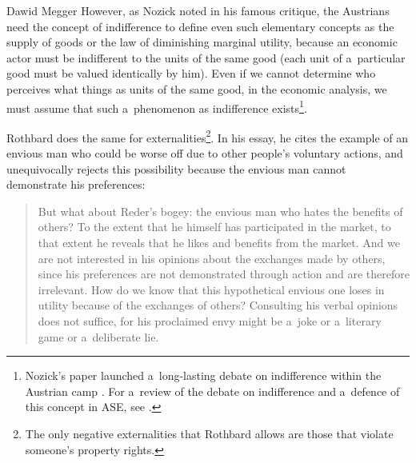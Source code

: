 \begin{artengenv}{Dawid Megger}
However, as Nozick 
\parencite*[][]{nozick_austrian_1977} %
 noted in his famous critique, the Austrians need the concept of indifference to define even such elementary concepts as the supply of goods or the law of diminishing marginal utility, because an economic actor must be indifferent to the units of the same good (each unit of a~particular good must be valued identically by him). Even if we cannot determine who perceives what things as units of the same good, in the economic analysis, we must assume that such a~phenomenon as indifference exists\footnote{Nozick's paper launched a~long-lasting debate on indifference within the Austrian camp 
\parencites[see e.g.,][]{block_robert_1980}[][]{block_rejoinder_2009}[][]{block_rejoinder_2010}[][]{hoppe_note_2005}[][]{hoppe_further_2009}[][]{machaj_praxeological_2007}[][]{wysocki_indifference_2016}[][]{wysocki_note_2017}. %
 For a~review of the debate on indifference and a~defence of this concept in ASE, see 
\parencite[][]{wysocki_austro-libertarian_2021}.%
}.



Rothbard does the same for externalities\footnote{The only negative externalities that Rothbard allows are those that violate someone's property rights.}. In his essay, he cites the example of an envious man who could be worse off due to other people's voluntary actions, and unequivocally rejects this possibility because the envious man cannot demonstrate his preferences:



\begin{quote}
But what about Reder's bogey: the envious man who hates the benefits of others? To the extent that he himself has participated in the market, to that extent he reveals that he likes and benefits from the market. And we are not interested in his opinions about the exchanges made by others, since his preferences are not demonstrated through action and are therefore irrelevant. How do we know that this hypothetical envious one loses in utility because of the exchanges of others? Consulting his verbal opinions does not suffice, for his proclaimed envy might be a~joke or a~literary game or a~deliberate lie. 
\parencite[][p.320]{rothbard_present_2011}%
\end{quote}





\end{artengenv}
